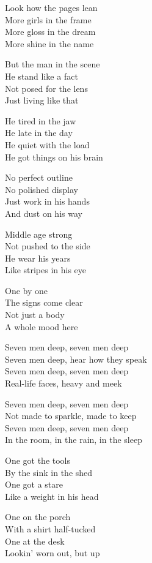\begin{lyrics}
Look how the pages lean\\
More girls in the frame\\
More gloss in the dream\\
More shine in the name

But the man in the scene\\
He stand like a fact\\
Not posed for the lens\\
Just living like that

He tired in the jaw\\
He late in the day\\
He quiet with the load\\
He got things on his brain

No perfect outline\\
No polished display\\
Just work in his hands\\
And dust on his way

Middle age strong\\
Not pushed to the side\\
He wear his years\\
Like stripes in his eye

One by one\\
The signs come clear\\
Not just a body\\
A whole mood here

Seven men deep, seven men deep\\
Seven men deep, hear how they speak\\
Seven men deep, seven men deep\\
Real-life faces, heavy and meek

Seven men deep, seven men deep\\
Not made to sparkle, made to keep\\
Seven men deep, seven men deep\\
In the room, in the rain, in the sleep

One got the tools\\
By the sink in the shed\\
One got a stare\\
Like a weight in his head

One on the porch\\
With a shirt half-tucked\\
One at the desk\\
Lookin’ worn out, but up


\end{lyrics}
